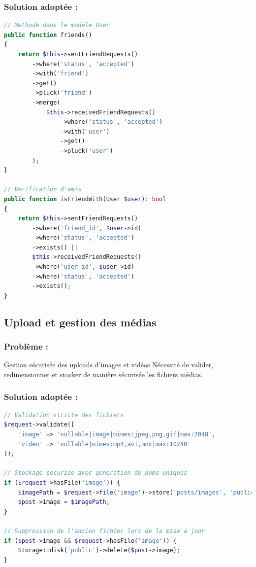 \documentclass[12pt,a4paper]{article}
\begin{document}
\subsubsection{Solution adopt\'ee :}
\begin{lstlisting}[language=PHP]
// Methode dans le modele User
public function friends()
{
    return $this->sentFriendRequests()
        ->where('status', 'accepted')
        ->with('friend')
        ->get()
        ->pluck('friend')
        ->merge(
            $this->receivedFriendRequests()
                ->where('status', 'accepted')
                ->with('user')
                ->get()
                ->pluck('user')
        );
}

// Verification d'amis
public function isFriendWith(User $user): bool
{
    return $this->sentFriendRequests()
        ->where('friend_id', $user->id)
        ->where('status', 'accepted')
        ->exists() ||
        $this->receivedFriendRequests()
        ->where('user_id', $user->id)
        ->where('status', 'accepted')
        ->exists();
}
\end{lstlisting}

\subsection{Upload et gestion des m\'edias}

\subsubsection{Probl\`eme :} Gestion s\'ecuris\'ee des uploads d'images et vid\'eos
N\'ecessit\'e de valider, redimensionner et stocker de mani\`ere s\'ecuris\'ee les fichiers m\'edias.

\subsubsection{Solution adopt\'ee :}
\begin{lstlisting}[language=PHP]
// Validation stricte des fichiers
$request->validate([
    'image' => 'nullable|image|mimes:jpeg,png,gif|max:2048',
    'video' => 'nullable|mimes:mp4,avi,mov|max:10240'
]);

// Stockage securise avec generation de noms uniques
if ($request->hasFile('image')) {
    $imagePath = $request->file('image')->store('posts/images', 'public');
    $post->image = $imagePath;
}

// Suppression de l'ancien fichier lors de la mise a jour
if ($post->image && $request->hasFile('image')) {
    Storage::disk('public')->delete($post->image);
}
\end{lstlisting}
\end{document}
